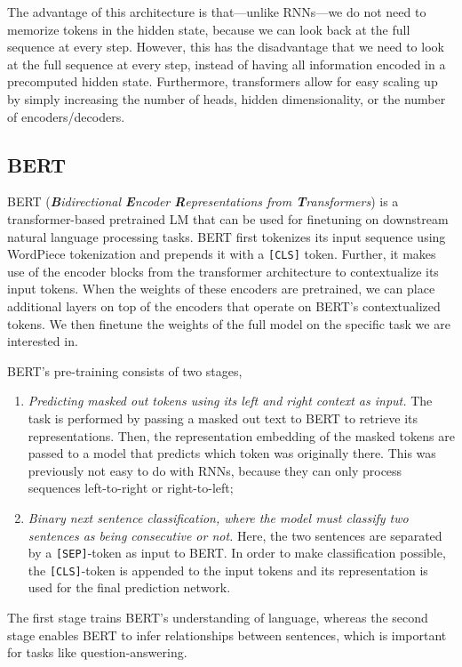 The advantage of this architecture is that---unlike RNNs---we do not need to memorize tokens in the
hidden state, because we can look back at the full sequence at every step. However, this has the
disadvantage that we need to look at the full sequence at every step, instead of having all
information encoded in a precomputed hidden state. Furthermore, transformers allow for easy scaling
up by simply increasing the number of heads, hidden dimensionality, or the number of
encoders/decoders.

\subsection{BERT}

BERT (\textit{\textbf{B}idirectional \textbf{E}ncoder \textbf{R}epresentations from
    \textbf{T}ransformers}) \citep{devlin2018bert} is a transformer-based pretrained LM that can be
used for finetuning on downstream natural language processing tasks. BERT first tokenizes its input
sequence using WordPiece tokenization \citep{wu2016google} and prepends it with a \texttt{[CLS]}
token. Further, it makes use of the encoder blocks from the transformer architecture to
contextualize its input tokens. When the weights of these encoders are pretrained, we can place
additional layers on top of the encoders that operate on BERT's contextualized tokens. We then
finetune the weights of the full model on the specific task we are interested in.

BERT's pre-training consists of two stages,
\begin{enumerate}
    \item \textit{Predicting masked out tokens using its left and right context as input.} The
          task is performed by passing a masked out text to BERT to retrieve its representations.
          Then, the representation embedding of the masked tokens are passed to a model that predicts which token
          was originally there. This was previously not easy to do with RNNs, because they can
          only process sequences left-to-right or right-to-left;
    \item \textit{Binary next sentence classification, where the model must classify two sentences as being
              consecutive or not.} Here, the two sentences are separated by a \texttt{[SEP]}-token as input to BERT.
          In order to make classification possible, the \texttt{[CLS]}-token is appended to the
          input tokens and its representation is used for the final prediction network.
\end{enumerate}
The first stage trains BERT's understanding of language, whereas the second stage enables BERT to infer relationships
between sentences, which is important for tasks like question-answering.

